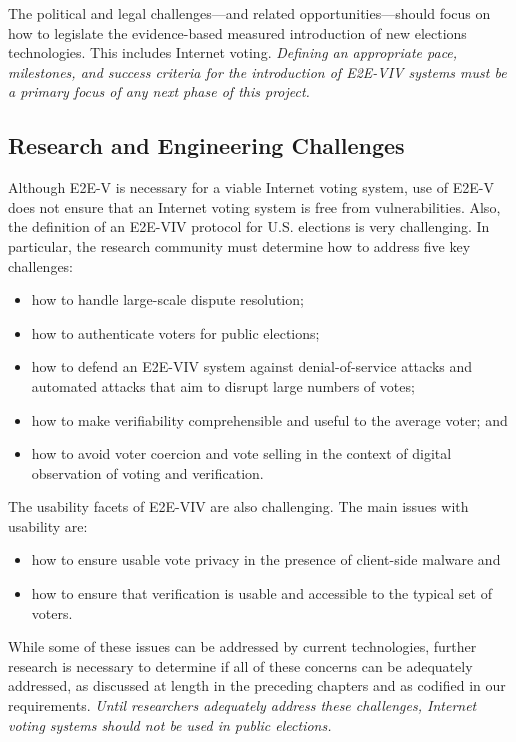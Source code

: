 The political and legal challenges---and related
opportunities---should focus on how to legislate the evidence-based
measured introduction of new elections technologies. This includes
Internet voting. \emph{Defining an appropriate pace, milestones, and
  success criteria for the introduction of E2E-VIV systems must be a
  primary focus of any next phase of this project.}

\subsection{Research and Engineering Challenges}

Although E2E-V is necessary for a viable Internet voting system, use
of E2E-V does not ensure that an Internet voting system is free from
vulnerabilities. Also, the definition of an E2E-VIV protocol for
U.S. elections is very challenging. In particular, the research
community must determine how to address five key challenges:

\begin{itemize}
\item how to handle large-scale dispute resolution;
\item how to authenticate voters for public elections;
\item how to defend an E2E-VIV system against denial-of-service
  attacks and automated attacks that aim to disrupt large numbers of
  votes;
\item how to make verifiability comprehensible and useful to the
  average voter; and
\item how to avoid voter coercion and vote selling in the context of
  digital observation of voting and verification.
\end{itemize}

The usability facets of E2E-VIV are also challenging. The main issues
with usability are:

\begin{itemize}
\item how to ensure usable vote privacy in the presence of client-side
  malware and
\item how to ensure that verification is usable and
  accessible to the typical set of voters.
\end{itemize}

While some of these issues can be addressed by current technologies,
further research is necessary to determine if all of these concerns
can be adequately addressed, as discussed at length in the preceding
chapters and as codified in our requirements. \emph{Until researchers
  adequately address these challenges, Internet voting systems should
  not be used in public elections.}

